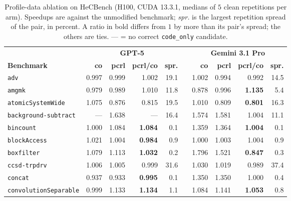 \begin{table}[t]
\centering
\footnotesize
\caption{Profile-data ablation on HeCBench (H100, CUDA 13.3.1, medians of $5$ clean repetitions per
  arm). Speedups are against the unmodified benchmark; \emph{spr.} is the largest repetition spread of
  the pair, in percent. A ratio in bold differs from $1$ by more than its pair's spread; the others are
  ties. --- = no correct \texttt{code\_only} candidate.}
\label{tab:profablhec}
\setlength{\tabcolsep}{2.5pt}
\begin{tabular}{@{}lrrrrcrrrr@{}}
\toprule
 & \multicolumn{4}{c}{\textbf{GPT-5}} && \multicolumn{4}{c}{\textbf{Gemini 3.1 Pro}} \\
\cmidrule(lr){2-5}\cmidrule(lr){7-10}
\textbf{Benchmark} & \textbf{co} & \textbf{pcrl} & \textbf{pcrl/co} & \textbf{spr.} &&
  \textbf{co} & \textbf{pcrl} & \textbf{pcrl/co} & \textbf{spr.} \\
\midrule
\texttt{adv}                  & 0.997 & 0.999 & 1.002 & 19.1 && 1.002 & 0.994 & 0.992 & 14.5 \\
\texttt{amgmk}                & 0.979 & 0.989 & 1.010 & 11.8 && 0.878 & 0.996 & \textbf{1.135} & 5.4 \\
\texttt{atomicSystemWide}     & 1.075 & 0.876 & 0.815 & 19.5 && 1.010 & 0.809 & \textbf{0.801} & 16.3 \\
\texttt{background-subtract}  & ---   & 1.638 & ---   & 16.4 && 1.574 & 1.581 & 1.004 & 11.1 \\
\texttt{bincount}             & 1.000 & 1.084 & \textbf{1.084} & 0.1 && 1.359 & 1.364 & \textbf{1.004} & 0.1 \\
\texttt{blockAccess}          & 1.021 & 1.004 & \textbf{0.984} & 0.9 && 1.000 & 1.003 & 1.004 & 0.9 \\
\texttt{boxfilter}            & 1.079 & 1.113 & \textbf{1.032} & 0.2 && 1.796 & 1.521 & \textbf{0.847} & 0.3 \\
\texttt{ccsd-trpdrv}          & 1.006 & 1.005 & 0.999 & 31.6 && 1.030 & 1.019 & 0.989 & 37.4 \\
\texttt{concat}               & 0.937 & 0.933 & \textbf{0.995} & 0.1 && 1.350 & 1.350 & 1.000 & 0.4 \\
\texttt{convolutionSeparable} & 0.999 & 1.133 & \textbf{1.134} & 1.1 && 1.084 & 1.141 & \textbf{1.053} & 0.8 \\
\bottomrule
\end{tabular}
\end{table}

